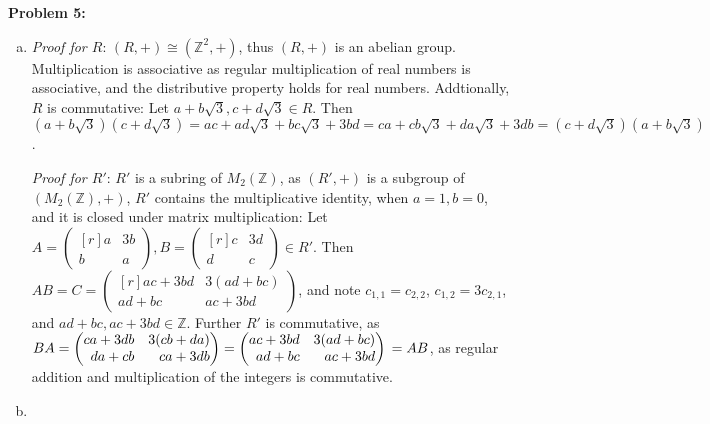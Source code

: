 \documentclass[12pt, letterpaper]{article}
\newenvironment{problem}
    [1]
    {\noindent \textbf{Problem #1:}}
    {\vspace{3mm}}
\begin{document}
\begin{problem}{5}
    \begin{enumerate}[(a)]
        \item \emph{Proof for $R$}: $(R, +) \cong (\mathbb{Z}^2, +)$, thus $(R, +)$ is an abelian 
        group. Multiplication is associative as regular multiplication of real numbers is associative,
        and the distributive property holds for real numbers. Addtionally, $R$ is commutative: Let
        $a + b\sqrt{3}, c + d\sqrt{3} \in R$. Then $(a + b\sqrt{3})(c + d\sqrt{3}) = ac + ad\sqrt{3}
        + bc\sqrt{3} + 3bd = ca + cb\sqrt{3} + da\sqrt{3} + 3db = (c + d\sqrt{3})(a + b\sqrt{3})$.

        \bigskip\noindent 
        \emph{Proof for $R'$}: $R'$ is a subring of $M_2(\mathbb{Z})$, as $(R', +)$ is a subgroup of
        $(M_2(\mathbb{Z}), +)$, $R'$ contains the multiplicative identity, when $a = 1, b = 0$, and 
        it is closed under matrix multiplication: Let $A = \begin{pmatrix*}[r] a & 3b \\ b & a 
        \end{pmatrix*}, B = \begin{pmatrix*}[r] c & 3d \\ d & c \end{pmatrix*} \in R'$. Then $AB = 
        C = \begin{pmatrix*}[r] ac + 3bd & 3(ad + bc) \\ ad + bc & ac + 3bd\end{pmatrix*}$, and note
        $c_{1,1} = c_{2,2}$, $c_{1,2} = 3c_{2,1}$, and $ad + bc, ac + 3bd \in \mathbb{Z}$. Further $R'$ 
        is commutative, as $BA = \begin{pmatrix*}[r] ca + 3db & 3(cb + da) \\ da + cb & ca + 3db
        \end{pmatrix*} = \begin{pmatrix*}[r] ac + 3bd & 3(ad + bc) \\ ad + bc & ac + 3bd\end{pmatrix*}
        \\= AB$, as regular addition and multiplication of the integers is commutative.

        \item 

    \end{enumerate}
\end{problem}
\end{document}
